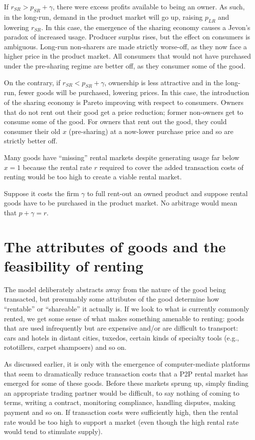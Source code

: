 \documentclass[11pt]{article}
\begin{document}
If $r_{SR} > p_{SR} + \gamma$, there were excess profits available to being an owner. 
As such, in the long-run, demand in the product market will go up, raising $p_{LR}$ and lowering $r_{SR}$. 
In this case, the emergence of the sharing economy causes a Jevon's paradox of increased usage. 
Producer surplus rises, but the effect on consumers is ambiguous. 
Long-run non-sharers are made strictly worse-off, as they now face a higher price in the product market. 
All consumers that would not have purchased under the pre-sharing regime are better off, as they consumer some of the good.

On the contrary, if $r_{SR} < p_{SR} + \gamma$, ownership is less attractive and in the long-run, fewer goods will be purchased, lowering prices. 
In this case, the introduction of the sharing economy is Pareto improving with respect to consumers. 
Owners that do not rent out their good get a price reduction; former non-owners get to consume some of the good. 
For owners that rent out the good, they could consumer their old $x$ (pre-sharing) at a now-lower purchase price and so are strictly better off. 

Many goods have ``missing'' rental markets despite generating usage far below $x = 1$ because the rental rate $r$ required to cover the added transaction costs of renting would be too high to create a viable rental market. 

Suppose it costs the firm $\gamma$ to full rent-out an owned product and suppose rental goods have to be purchased in the product market. 
No arbitrage would mean that $p + \gamma = r$. 

\section{The attributes of goods and the feasibility of renting} 

The model deliberately abstracts away from the nature of the good being transacted, but presumably some attributes of the good determine how ``rentable''  or ``shareable'' it actually is. 
If we look to what is currently commonly rented, we get some sense of what makes something amenable to renting:  
goods that are used infrequently but are expensive and/or are difficult to transport: 
cars and hotels in distant cities, tuxedos, certain kinds of specialty tools (e.g., rototillers, carpet shampoers) and so on. 

As discussed earlier, it is only with the emergence of computer-mediate platforms that seem to dramatically reduce transaction costs that a P2P rental market has emerged for some of these goods. 
Before these markets sprung up, simply finding an appropriate trading partner would be difficult, to say nothing of coming to terms, writing a contract, monitoring compliance, handling disputes, making payment and so on. 
If transaction costs were sufficiently high, then the rental rate would be too high to support a market (even though the high rental rate would tend to stimulate supply). 
\end{document}
